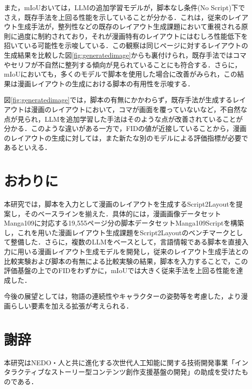 また，mIoUおいては，LLMの追加学習モデルが，脚本なし条件(No Script)下でさえ，既存手法を上回る性能を示していることが分かる．これは，従来のレイアウト生成手法が，整列性などの既存のレイアウト生成課題において重視される原則に過度に制約されており，それが漫画特有のレイアウトにはむしろ性能低下を招いている可能性を示唆している．この観察は同じページに対するレイアウトの生成結果を比較した図\ref{fig:generatedimage}からも裏付けられ，既存手法ではコマやセリフが不自然に整列する傾向が見られていることにも符合する．さらに，mIoUにおいても，多くのモデルで脚本を使用した場合に改善がみられ，この結果は漫画レイアウトの生成における脚本の有用性を示唆する．

図\ref{fig:generatedimage}では，脚本の有無にかかわらず，既存手法が生成するレイアウトは漫画のレイアウトにおいて，コマが画面を覆っていないなど，不自然な点が見られ，LLMを追加学習した手法はそのような点が改善されていることが分かる．このような違いがある一方で，FIDの値が近接していることから，漫画のレイアウトの生成に対しては，また新たな別のモデルによる評価指標が必要であるといえる．

\section{おわりに}
本研究では，脚本を入力として漫画のレイアウトを生成するScript2Layoutを提案し，そのベースラインを揃えた．具体的には，漫画画像データセットManga109に対応する19,555ページ分の脚本データセットManga109Scriptを構築し，これを用いた漫画レイアウト生成課題をScript2Layoutのベンチマークとして整備した．さらに，複数のLLMをベースとして，言語情報である脚本を直接入力に用いる漫画レイアウト生成モデルを開発し，従来のレイアウト生成手法との比較実験および脚本の有無による比較実験の結果，脚本を入力することで，この評価基盤の上でのFIDをわずかに，mIoUでは大きく従来手法を上回る性能を達成した．

今後の展望としては，物語の連続性やキャラクターの姿勢等を考慮した，より漫画らしい要素を加える拡張が考えられる．

\section*{謝辞}
本研究はNEDO・人と共に進化する次世代人工知能に関する技術開発事業「インタラクティブなストーリー型コンテンツ創作支援基盤の開発」の助成を受けたものである．

